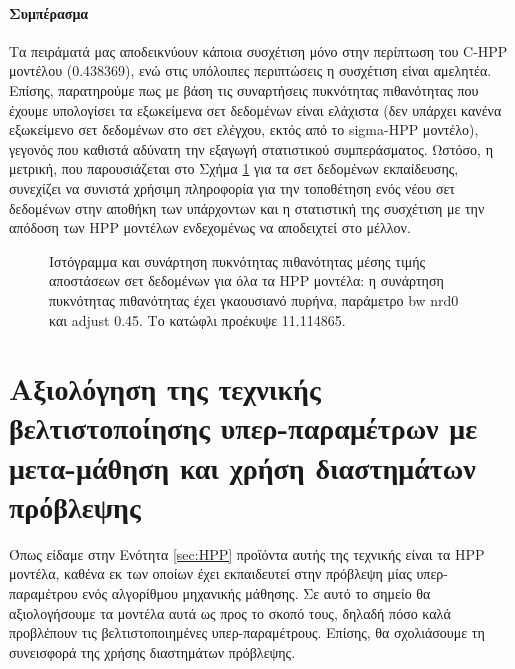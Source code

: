 \paragraph{Συμπέρασμα} Τα πειράματά μας αποδεικνύουν κάποια συσχέτιση μόνο στην περίπτωση του C-HPP μοντέλου (0.438369), ενώ στις υπόλοιπες περιπτώσεις η συσχέτιση είναι αμελητέα. Επίσης, παρατηρούμε πως με βάση τις συναρτήσεις πυκνότητας πιθανότητας που έχουμε υπολογίσει τα εξωκείμενα σετ δεδομένων είναι ελάχιστα (δεν υπάρχει κανένα εξωκείμενο σετ δεδομένων στο σετ ελέγχου, εκτός από το sigma-HPP μοντέλο), γεγονός που καθιστά αδύνατη την εξαγωγή στατιστικού συμπεράσματος. Ωστόσο, η μετρική, που παρουσιάζεται στο Σχήμα \ref{fig:histtotal} για τα σετ δεδομένων εκπαίδευσης, συνεχίζει να συνιστά χρήσιμη πληροφορία για την τοποθέτηση ενός νέου σετ δεδομένων στην αποθήκη των υπάρχοντων και η στατιστική της συσχέτιση με την απόδοση των HPP μοντέλων ενδεχομένως να αποδειχτεί στο μέλλον.

\begin{figure}[htbp]
	\scalebox{0.7}{
		}
	\caption[Ιστόγραμμα και συνάρτηση πυκνότητας πιθανότητας μέσης τιμής αποστάσεων σετ δεδομένων για όλα τα HPP μοντέλα]{Ιστόγραμμα και συνάρτηση πυκνότητας πιθανότητας μέσης τιμής αποστάσεων σετ δεδομένων για όλα τα HPP μοντέλα: η συνάρτηση πυκνότητας πιθανότητας έχει γκαουσιανό πυρήνα, παράμετρο bw nrd0 και adjust 0.45. Το κατώφλι προέκυψε 11.114865.}
	\label{fig:histtotal}
\end{figure}

\section{Αξιολόγηση της τεχνικής βελτιστοποίησης υπερ-παραμέτρων με μετα-μάθηση και χρήση διαστημάτων πρόβλεψης}\label{section:hppexp}
Όπως είδαμε στην Ενότητα \ref{sec:HPP} προϊόντα αυτής της τεχνικής είναι τα \gls{HPP} μοντέλα, καθένα εκ των οποίων έχει εκπαιδευτεί στην πρόβλεψη μίας υπερ-παραμέτρου ενός αλγορίθμου μηχανικής μάθησης. Σε αυτό το σημείο θα αξιολογήσουμε τα μοντέλα αυτά ως προς το σκοπό τους, δηλαδή πόσο καλά προβλέπουν τις βελτιστοποιημένες υπερ-παραμέτρους. Επίσης, θα σχολιάσουμε τη συνεισφορά της χρήσης διαστημάτων πρόβλεψης.


